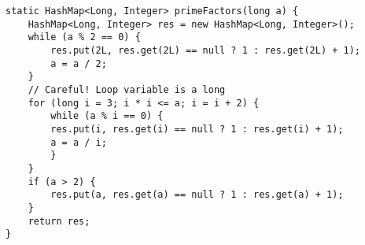 \begin{verbatim}
static HashMap<Long, Integer> primeFactors(long a) {
	HashMap<Long, Integer> res = new HashMap<Long, Integer>();
	while (a % 2 == 0) {
		res.put(2L, res.get(2L) == null ? 1 : res.get(2L) + 1);
		a = a / 2;
	}
	// Careful! Loop variable is a long
	for (long i = 3; i * i <= a; i = i + 2) {
		while (a % i == 0) {
		res.put(i, res.get(i) == null ? 1 : res.get(i) + 1);
		a = a / i;
		}
	}
	if (a > 2) {
		res.put(a, res.get(a) == null ? 1 : res.get(a) + 1);
	}
	return res;
}
\end{verbatim}
